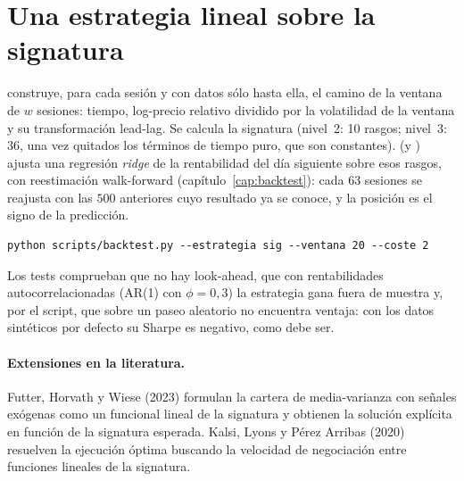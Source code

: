 \section{Una estrategia lineal sobre la signatura}
 construye, para cada sesión y con datos sólo hasta ella, el camino de
la ventana de $w$ sesiones: tiempo, log-precio relativo dividido por la volatilidad de la ventana y su
transformación lead-lag. Se calcula la signatura (nivel~2: 10 rasgos; nivel~3: 36, una vez quitados los
términos de tiempo puro, que son constantes).  (y
) ajusta una regresión \emph{ridge} de la rentabilidad del día
siguiente sobre esos rasgos, con reestimación walk-forward (capítulo~\ref{cap:backtest}): cada $63$
sesiones se reajusta con las $500$ anteriores cuyo resultado ya se conoce, y la posición es el signo de
la predicción.
\begin{lstlisting}
python scripts/backtest.py --estrategia sig --ventana 20 --coste 2
\end{lstlisting}
Los tests comprueban que no hay look-ahead, que con rentabilidades autocorrelacionadas (AR(1) con
$\phi=0{,}3$) la estrategia gana fuera de muestra y, por el script, que sobre un paseo aleatorio no
encuentra ventaja: con los datos sintéticos por defecto su Sharpe es negativo, como debe ser.

\paragraph{Extensiones en la literatura.} Futter, Horvath y Wiese (2023) formulan la cartera de
media-varianza con señales exógenas como un funcional lineal de la signatura y obtienen la solución
explícita en función de la signatura esperada. Kalsi, Lyons y Pérez Arribas (2020) resuelven la
ejecución óptima buscando la velocidad de negociación entre funciones lineales de la signatura.

